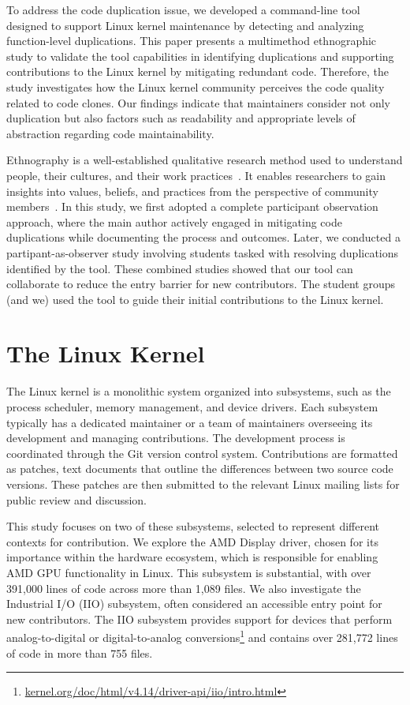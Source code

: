 \documentclass[10pt,conference]{IEEEtran}
\begin{document}
To address the code duplication issue, we developed a command-line tool designed to support Linux kernel maintenance by detecting and analyzing function-level duplications. This paper presents a multimethod ethnographic study to validate the tool capabilities in identifying duplications and supporting contributions to the Linux kernel by mitigating redundant code. Therefore, the study investigates how the Linux kernel community perceives the code quality related to code clones. Our findings indicate that maintainers consider not only duplication but also factors such as readability and appropriate levels of abstraction regarding code maintainability.

Ethnography is a well-established qualitative research method used to understand people, their cultures, and their work practices~\cite{bookethno}. It enables researchers to gain insights into values, beliefs, and practices from the perspective of community members~\cite{ethnosoft}.  
In this study, we first adopted a complete participant observation approach, where the main author actively engaged in mitigating code duplications while documenting the process and outcomes. Later, we conducted a partipant-as-observer study involving students tasked with resolving duplications identified by the tool. These combined studies showed that our tool can collaborate to reduce the entry barrier for new contributors. The student groups (and we) used the tool to guide their initial contributions to the Linux kernel.


\section{The Linux Kernel}

The Linux kernel is a monolithic system organized into subsystems, such as the process scheduler, memory management, and device drivers. Each subsystem typically has a dedicated maintainer or a team of maintainers overseeing its development and managing contributions. The development process is coordinated through the Git version control system. Contributions are formatted as patches, text documents that outline the differences between two source code versions. These patches are then submitted to the relevant Linux mailing lists for public review and discussion.

This study focuses on two of these subsystems, selected to represent different contexts for contribution. We explore the AMD Display driver, chosen for its importance within the hardware ecosystem, which is responsible for enabling AMD GPU functionality in Linux. This subsystem is substantial, with over 391,000 lines of code across more than 1,089 files. We also investigate the Industrial I/O (IIO) subsystem, often considered an accessible entry point for new contributors. The IIO subsystem provides support for devices that perform analog-to-digital or digital-to-analog conversions\footnote{\href{https://kernel.org/doc/html/v4.14/driver-api/iio/intro.html}{kernel.org/doc/html/v4.14/driver-api/iio/intro.html}} and contains over 281,772 lines of code in more than 755 files.
\end{document}
